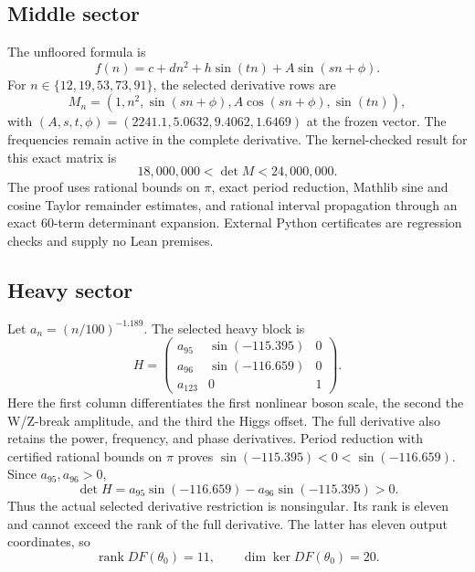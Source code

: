 \documentclass[11pt]{article}
\newcommand{\rank}{\operatorname{rank}}
\begin{document}
\subsection{Middle sector}
The unfloored formula is
\begin{equation}
 f(n)=c+dn^2+h\sin(tn)+A\sin(sn+\phi).
\end{equation}
For $n\in\{12,19,53,73,91\}$, the selected derivative rows are
\begin{equation}
 M_n=(1,n^2,\sin(sn+\phi),A\cos(sn+\phi),\sin(tn)),
 \label{eq:middle}
\end{equation}
with $(A,s,t,\phi)=(2241.1,5.0632,9.4062,1.6469)$ at the frozen
vector. The frequencies remain active in the complete derivative.
The kernel-checked result for this exact matrix is
\begin{equation}
 \boxed{18{,}000{,}000<\det M<24{,}000{,}000}.
 \label{eq:middledet}
\end{equation}
The proof uses rational bounds on $\pi$, exact period reduction,
Mathlib sine and cosine Taylor remainder estimates, and rational interval
propagation through an exact 60-term determinant expansion. External
Python certificates are regression checks and supply no Lean premises.

\subsection{Heavy sector}
Let $a_n=(n/100)^{-1.189}$. The selected heavy block is
\begin{equation}
 H=\begin{pmatrix}
 a_{95}&\sin(-115.395)&0\\
 a_{96}&\sin(-116.659)&0\\
 a_{123}&0&1
 \end{pmatrix}.
\end{equation}
Here the first column differentiates the first nonlinear boson scale,
the second the W/Z-break amplitude, and the third the Higgs offset.
The full derivative also retains the power, frequency, and phase derivatives.
Period reduction with certified rational bounds on $\pi$ proves
$\sin(-115.395)<0<\sin(-116.659)$. Since $a_{95},a_{96}>0$,
\begin{equation}
 \det H=a_{95}\sin(-116.659)-a_{96}\sin(-115.395)>0.
 \label{eq:heavydet}
\end{equation}
Thus the actual selected derivative restriction is nonsingular. Its rank
is eleven and cannot exceed the rank of the full derivative. The latter
has eleven output coordinates, so
\begin{equation}
 \boxed{\rank DF(\theta_0)=11},\qquad
 \boxed{\dim\ker DF(\theta_0)=20}.
\end{equation}
\end{document}
